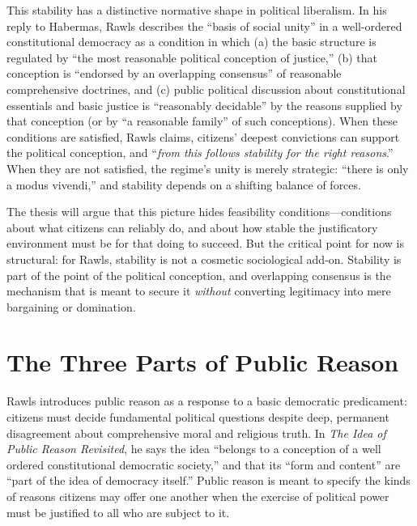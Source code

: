 \documentclass[12pt]{report}
\begin{document}
This stability has a distinctive normative shape in political liberalism. In his reply to Habermas, Rawls describes the “basis of social unity” in a well-ordered constitutional democracy as a condition in which (a) the basic structure is regulated by “the most reasonable political conception of justice,” (b) that conception is “endorsed by an overlapping consensus” of reasonable comprehensive doctrines, and (c) public political discussion about constitutional essentials and basic justice is “reasonably decidable” by the reasons supplied by that conception (or by “a reasonable family” of such conceptions).\parencite[p.~147]{rawls1995reply} When these conditions are satisfied, Rawls claims, citizens’ deepest convictions can support the political conception, and “\emph{from this follows stability for the right reasons}.”\parencite[p.~147]{rawls1995reply} When they are not satisfied, the regime’s unity is merely strategic: “there is only a modus vivendi,” and stability depends on a shifting balance of forces.\parencite[p.~147]{rawls1995reply}

The thesis will argue that this picture hides feasibility conditions---conditions about what citizens can reliably do, and about how stable the justificatory environment must be for that doing to succeed. But the critical point for now is structural: for Rawls, stability is not a cosmetic sociological add-on. Stability is part of the point of the political conception, and overlapping consensus is the mechanism that is meant to secure it \emph{without} converting legitimacy into mere bargaining or domination.\parencite[p.~1]{rawls1987overlapping}

\section{The Three Parts of Public Reason}

Rawls introduces public reason as a response to a basic democratic predicament: citizens must decide fundamental political questions despite deep, permanent disagreement about comprehensive moral and religious truth. In \emph{The Idea of Public Reason Revisited}, he says the idea “belongs to a conception of a well ordered constitutional democratic society,” and that its “form and content” are “part of the idea of democracy itself.”\parencite[p.~765]{rawls1997public} Public reason is meant to specify the kinds of reasons citizens may offer one another when the exercise of political power must be justified to all who are subject to it.
\end{document}
